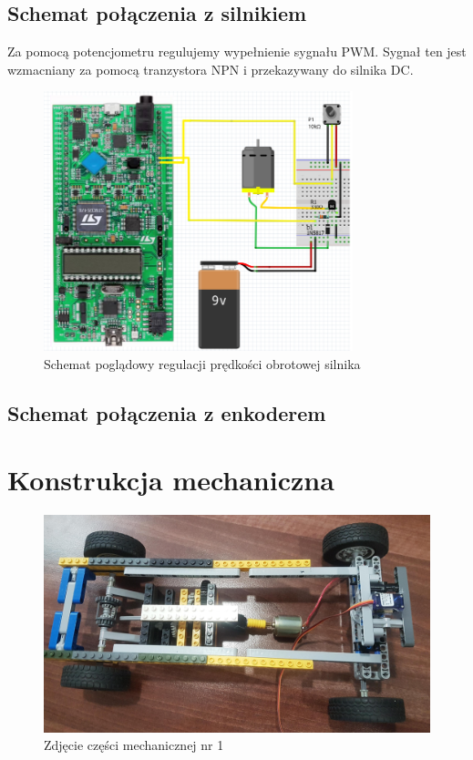 \documentclass[10pt, a4paper]{article}
\begin{document}
	\subsection{Schemat połączenia z silnikiem}
	Za pomocą potencjometru regulujemy wypełnienie sygnału PWM. Sygnał ten jest wzmacniany za pomocą tranzystora NPN i przekazywany do silnika DC.
	
	\begin{figure}[H]
		\centering
		\includegraphics[width=0.8\textwidth]{figures/pwm.png}
		\caption{Schemat poglądowy regulacji prędkości obrotowej silnika}
		\label{fig:KonfiguracjaPWM}
	\end{figure}
	
	\subsection{Schemat połączenia z enkoderem}
\section{Konstrukcja mechaniczna}

	\begin{figure}[H]
		\centering
		\includegraphics[width=1\textwidth]{figures/20190410_135905.jpg}
		\caption{Zdjęcie części mechanicznej nr 1}
		\label{fig:Zdjęcie części mechanicznej nr 1}
	\end{figure}
	
\end{document}
